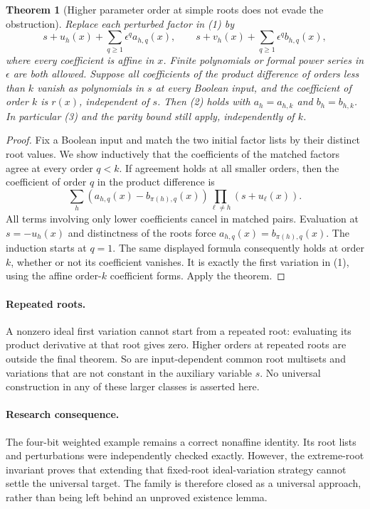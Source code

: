\documentclass[11pt]{article}
\newtheorem{theorem}{Theorem}
\begin{document}
\begin{theorem}[Higher parameter order at simple roots does not evade the obstruction]
Replace each perturbed factor in (1) by
\[
 s+u_h(x)+\sum_{q\ge1}\epsilon^q a_{h,q}(x),
 \qquad
 s+v_h(x)+\sum_{q\ge1}\epsilon^q b_{h,q}(x),
\]
where every coefficient is affine in $x$. Finite polynomials or
formal power series in $\epsilon$ are both allowed. Suppose all
coefficients of the product difference of orders less than $k$ vanish
as polynomials in $s$ at every Boolean input, and the coefficient of
order $k$ is $r(x)$, independent of $s$. Then (2) holds with
$a_h=a_{h,k}$ and $b_h=b_{h,k}$. In particular (3) and the parity
bound still apply, independently of $k$.
\end{theorem}
\begin{proof}
Fix a Boolean input and match the two initial factor lists by their
distinct root values. We show inductively that the coefficients of
the matched factors agree at every order $q<k$. If agreement holds
at all smaller orders, then the coefficient of order $q$ in the
product difference is
\[
 \sum_h(a_{h,q}(x)-b_{\pi(h),q}(x))
                  \prod_{\ell\ne h}(s+u_\ell(x)).
\]
All terms involving only lower coefficients cancel in matched pairs.
Evaluation at $s=-u_h(x)$ and distinctness of the roots force
$a_{h,q}(x)=b_{\pi(h),q}(x)$. The induction starts at $q=1$.
The same displayed formula consequently holds at order $k$, whether
or not its coefficient vanishes. It is exactly the first variation
in (1), using the affine order-$k$ coefficient forms. Apply the
theorem.
\end{proof}

\paragraph{Repeated roots.}
A nonzero ideal first variation cannot start from a repeated root:
evaluating its product derivative at that root gives zero. Higher
orders at repeated roots are outside the final theorem. So are
input-dependent common root multisets and variations that are not
constant in the auxiliary variable $s$. No universal construction
in any of these larger classes is asserted here.

\paragraph{Research consequence.}
The four-bit weighted example remains a correct nonaffine identity.
Its root lists and perturbations were independently checked exactly.
However, the extreme-root invariant proves that extending that
fixed-root ideal-variation strategy cannot settle the universal target.
The family is therefore closed as a universal approach, rather than
being left behind an unproved existence lemma.
\end{document}
